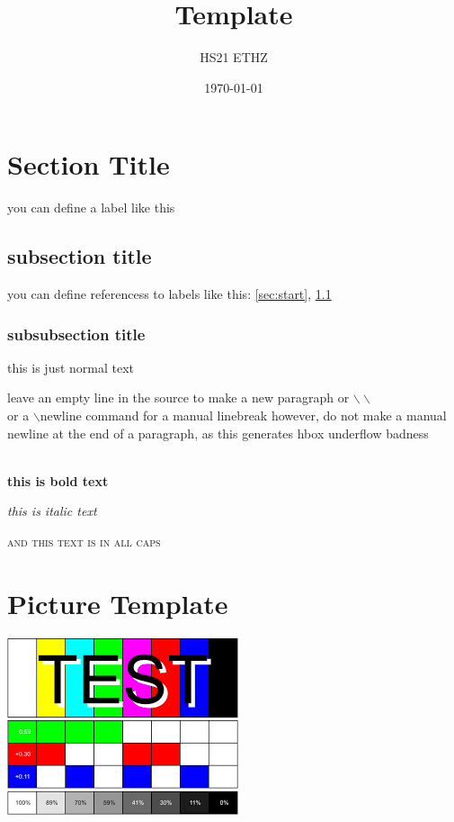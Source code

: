 \documentclass[a4paper,10pt,landscape]{scrartcl}
\title{Template}
\subtitle{HS21 ETHZ}
\author{}
\date{\today}
\begin{document}
\begin{multicols*}{3}
%
\maketitle
%
\section{Section Title}
you can define a label like this \label{sec:start}
\subsection{subsection title} \label{sec:second}
you can define referencess to labels like this: \ref{sec:start}, \ref{sec:second}
\subsubsection{subsubsection title}
this is just normal text

leave an empty line in the source to make a new paragraph
or $\backslash\backslash$ \\
or a $\backslash$newline command for a manual linebreak\newline
however, do not make a manual newline at the end of a paragraph, as this generates hbox underflow badness \\

\\

\textbf{this is bold text}

\textit{this is italic text}

\textsc{and this text is in all caps}

\vfill\null %
\columnbreak
%
\section{Picture Template}
\includegraphics[width=\columnwidth]{images/test.jpeg}
%

\end{multicols*}
\end{document}
